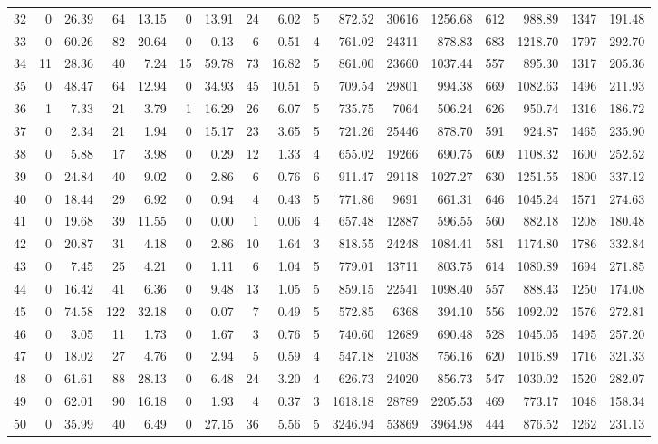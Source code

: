 \begin{table}
\begin{tabular}{lrrrrrrrrrrrrrrrr}
32 & 0 & 26.39 & 64 & 13.15 & 0 & 13.91 & 24 & 6.02 & 5 & 872.52 & 30616 & 1256.68 & 612 & 988.89 & 1347 & 191.48 \\
33 & 0 & 60.26 & 82 & 20.64 & 0 & 0.13 & 6 & 0.51 & 4 & 761.02 & 24311 & 878.83 & 683 & 1218.70 & 1797 & 292.70 \\
34 & 11 & 28.36 & 40 & 7.24 & 15 & 59.78 & 73 & 16.82 & 5 & 861.00 & 23660 & 1037.44 & 557 & 895.30 & 1317 & 205.36 \\
35 & 0 & 48.47 & 64 & 12.94 & 0 & 34.93 & 45 & 10.51 & 5 & 709.54 & 29801 & 994.38 & 669 & 1082.63 & 1496 & 211.93 \\
36 & 1 & 7.33 & 21 & 3.79 & 1 & 16.29 & 26 & 6.07 & 5 & 735.75 & 7064 & 506.24 & 626 & 950.74 & 1316 & 186.72 \\
37 & 0 & 2.34 & 21 & 1.94 & 0 & 15.17 & 23 & 3.65 & 5 & 721.26 & 25446 & 878.70 & 591 & 924.87 & 1465 & 235.90 \\
38 & 0 & 5.88 & 17 & 3.98 & 0 & 0.29 & 12 & 1.33 & 4 & 655.02 & 19266 & 690.75 & 609 & 1108.32 & 1600 & 252.52 \\
39 & 0 & 24.84 & 40 & 9.02 & 0 & 2.86 & 6 & 0.76 & 6 & 911.47 & 29118 & 1027.27 & 630 & 1251.55 & 1800 & 337.12 \\
40 & 0 & 18.44 & 29 & 6.92 & 0 & 0.94 & 4 & 0.43 & 5 & 771.86 & 9691 & 661.31 & 646 & 1045.24 & 1571 & 274.63 \\
41 & 0 & 19.68 & 39 & 11.55 & 0 & 0.00 & 1 & 0.06 & 4 & 657.48 & 12887 & 596.55 & 560 & 882.18 & 1208 & 180.48 \\
42 & 0 & 20.87 & 31 & 4.18 & 0 & 2.86 & 10 & 1.64 & 3 & 818.55 & 24248 & 1084.41 & 581 & 1174.80 & 1786 & 332.84 \\
43 & 0 & 7.45 & 25 & 4.21 & 0 & 1.11 & 6 & 1.04 & 5 & 779.01 & 13711 & 803.75 & 614 & 1080.89 & 1694 & 271.85 \\
44 & 0 & 16.42 & 41 & 6.36 & 0 & 9.48 & 13 & 1.05 & 5 & 859.15 & 22541 & 1098.40 & 557 & 888.43 & 1250 & 174.08 \\
45 & 0 & 74.58 & 122 & 32.18 & 0 & 0.07 & 7 & 0.49 & 5 & 572.85 & 6368 & 394.10 & 556 & 1092.02 & 1576 & 272.81 \\
46 & 0 & 3.05 & 11 & 1.73 & 0 & 1.67 & 3 & 0.76 & 5 & 740.60 & 12689 & 690.48 & 528 & 1045.05 & 1495 & 257.20 \\
47 & 0 & 18.02 & 27 & 4.76 & 0 & 2.94 & 5 & 0.59 & 4 & 547.18 & 21038 & 756.16 & 620 & 1016.89 & 1716 & 321.33 \\
48 & 0 & 61.61 & 88 & 28.13 & 0 & 6.48 & 24 & 3.20 & 4 & 626.73 & 24020 & 856.73 & 547 & 1030.02 & 1520 & 282.07 \\
49 & 0 & 62.01 & 90 & 16.18 & 0 & 1.93 & 4 & 0.37 & 3 & 1618.18 & 28789 & 2205.53 & 469 & 773.17 & 1048 & 158.34 \\
50 & 0 & 35.99 & 40 & 6.49 & 0 & 27.15 & 36 & 5.56 & 5 & 3246.94 & 53869 & 3964.98 & 444 & 876.52 & 1262 & 231.13 \\
\bottomrule
\end{tabular}
\end{table}
